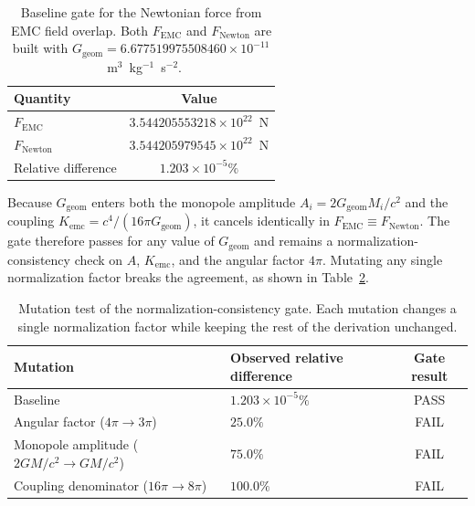 \documentclass[10pt,a4paper]{article}
\begin{document}
\begin{table}[h!]
	\centering
	\small
	\caption{Baseline gate for the Newtonian force from EMC field overlap.
		Both $F_{\text{EMC}}$ and $F_{\text{Newton}}$ are built with
		$G_{\text{geom}} = 6.677519975508460 \times 10^{-11}$~m$^3$~kg$^{-1}$~s$^{-2}$.}
	\label{tab:newtonian_baseline}
	\begin{tabular}{lc}
		\toprule
		\textbf{Quantity} & \textbf{Value} \\
		\midrule
		$F_{\text{EMC}}$        & $3.544205553218 \times 10^{22}$~N \\
		$F_{\text{Newton}}$     & $3.544205979545 \times 10^{22}$~N \\
		Relative difference     & $1.203 \times 10^{-5}\%$ \\
		\bottomrule
	\end{tabular}
\end{table}

Because $G_{\text{geom}}$ enters both the monopole amplitude
$A_i = 2G_{\text{geom}}M_i/c^2$ and the coupling
$K_{\text{emc}} = c^4/(16\pi G_{\text{geom}})$, it cancels identically
in $F_{\text{EMC}} \equiv F_{\text{Newton}}$. The gate therefore
passes for any value of $G_{\text{geom}}$ and remains a
normalization-consistency check on $A$, $K_{\text{emc}}$, and the
angular factor $4\pi$. Mutating any single normalization factor
breaks the agreement, as shown in Table~\ref{tab:newtonian_mutations}.

\begin{table}[h!]
	\centering
	\small
	\caption{Mutation test of the normalization-consistency gate. Each
		mutation changes a single normalization factor while keeping
		the rest of the derivation unchanged.}
	\label{tab:newtonian_mutations}
	\begin{tabular}{llc}
		\toprule
		\textbf{Mutation} & \textbf{Observed relative difference} & \textbf{Gate result} \\
		\midrule
		Baseline                                     & $1.203 \times 10^{-5}\%$ & PASS \\
		Angular factor ($4\pi \to 3\pi$)             & $25.0\%$                 & FAIL \\
		Monopole amplitude ($2GM/c^2 \to GM/c^2$)    & $75.0\%$                 & FAIL \\
		Coupling denominator ($16\pi \to 8\pi$)      & $100.0\%$                & FAIL \\
		\bottomrule
	\end{tabular}
\end{table}
\end{document}
